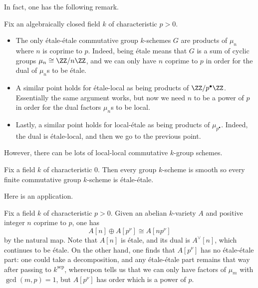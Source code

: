 \documentclass[../notes.tex]{subfiles}
\begin{document}
In fact, one has the following remark.
\begin{remark} \label{rem:classify-pieces-of-group-scheme}
	Fix an algebraically closed field $k$ of characteristic $p>0$.
	\begin{itemize}
		\item The only \'etale-\'etale commutative group $k$-schemes $G$ are products of $\mu_n$ where $n$ is coprime to $p$. Indeed, being \'etale means that $G$ is a sum of cyclic groups $\mu_n\cong\ZZ/n\ZZ$, and we can only have $n$ coprime to $p$ in order for the dual of $\mu_n$s to be \'etale.
		\item A similar point holds for \'etale-local as being products of $\ZZ/p^\bullet\ZZ$. Essentially the same argument works, but now we need $n$ to be a power of $p$ in order for the dual factors $\mu_n$s to be local.
		\item Lastly, a similar point holds for local-\'etale as being products of $\mu_{p^\bullet}$. Indeed, the dual is \'etale-local, and then we go to the previous point.
	\end{itemize}
	However, there can be lots of local-local commutative $k$-group schemes.%
\end{remark}
\begin{remark}
	Fix a field $k$ of characteristic $0$. Then every group $k$-scheme is smooth so every finite commutative group $k$-scheme is \'etale-\'etale.
\end{remark}
Here is an application.
\begin{remark} \label{rem:decompose-a-torsion}
	Fix a field $k$ of characteristic $p>0$. Given an abelian $k$-variety $A$ and positive integer $n$ coprime to $p$, one has
	\[A[n]\oplus A\left[p^\nu\right]\cong A\left[np^\nu\right]\]
	by the natural map. Note that $A[n]$ is \'etale, and its dual is $A^\lor[n]$, which continues to be \'etale. On the other hand, one finds that $A[p^\nu]$ has no \'etale-\'etale part: one could take a decomposition, and any \'etale-\'etale part remains that way after passing to $k^{\mathrm{sep}}$, whereupon  tells us that we can only have factors of $\mu_m$ with $\gcd(m,p)=1$, but $A[p^\nu]$ has order which is a power of $p$.
\end{remark}
\end{document}
